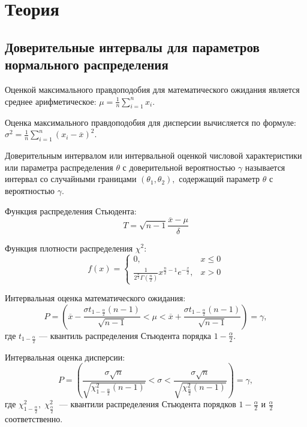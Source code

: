 \documentclass[12pt,a4paper]{article}
\begin{document}
	\section{Теория}
	\subsection{Доверительные интервалы для параметров нормального распределения}
	Оценкой максимального правдоподобия для математического ожидания  является среднее арифметическое: $\mu=\frac{1}{n}\sum\limits_{i=1}^nx_i.$
	
	Оценка максимального правдоподобия для дисперсии вычисляется по формуле: $\sigma^2 = \frac{1}{n}\sum\limits_{i=1}^n(x_i-\overline{x})^2.$
	
	Доверительным интервалом или интервальной оценкой числовой характеристики или параметра распределения $\theta$ с доверительной вероятностью $\gamma$ называется интервал со случайными границами $(\theta_1,\theta_2),$ содержащий параметр $\theta$ с вероятностью $\gamma$.
	
	Функция распределения Стьюдента:
	\begin{equation}
	T = \sqrt{n-1}\frac{\overline{x}-\mu}{\delta}
	\end{equation}
	
	Функция плотности распределения $\chi^2$:
	\begin{equation}
	f(x) =
	\begin{cases}
	0,&x\leq 0\\
	\frac{1}{2^\frac{n}{2}\Gamma\left(\frac{n}{2}\right)}x^{\frac{n}{2}-1}e^{-\frac{x}{2}},& x>0
	\end{cases}
	\end{equation}

	Интервальная оценка математического ожидания:
	\begin{equation}
	P=\left(\overline{x}-\frac{\sigma t_{1-\frac{\alpha}{2}}(n-1)}{\sqrt{n-1}}<\mu<\overline{x}+\frac{\sigma t_{1-\frac{\alpha}{2}}(n-1)}{\sqrt{n-1}}\right) = \gamma,
	\end{equation}
	где $t_{1-\frac{\alpha}{2}}$ --- квантиль распределения Стьюдента порядка $1-\frac{\alpha}{2}$.
	
	Интервальная оценка дисперсии:
	\begin{equation}
	P=\left(\frac{\sigma\sqrt{n}}{\sqrt{\chi^2_{1-\frac{\alpha}{2}}(n-1)}}<\sigma<\frac{\sigma\sqrt{n}}{\sqrt{\chi^2_\frac{\alpha}{2}(n-1)}}\right) = \gamma,
	\end{equation}
	где $\chi_{1-\frac{\alpha}{2}}^2,\;\chi_\frac{\alpha}{2}^2\;$ --- квантили распределения Стьюдента порядков $1-\frac{\alpha}{2}$ и $\frac{\alpha}{2}$ соответственно.
	
\end{document}
